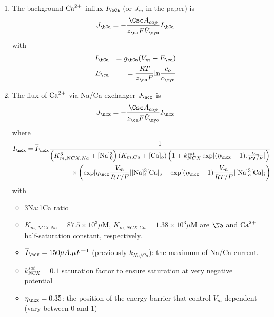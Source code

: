 \begin{enumerate}
\item The background ${\text{Ca}^{2+}}$ influx $I_\bCa$ (or $J_{in}$ in the paper)
  is~\citep{rice1999mgg}
  \begin{equation}
    \label{eq:1020}
    J_\bCa = -\frac{\Csc A_{cap}}{z_\ca F \hat{V}_\myo}I_\bCa
  \end{equation}
  with 
  \begin{eqnarray}
    \label{eq:1026}
    I_\bCa&&=g_\bCa(V_m-E_\ca) \\
    E_\ca &&= \frac{RT}{z_\ca F}\ln\frac{c_o}{c_\myo}
  \end{eqnarray}


\item The flux of ${\text{Ca}^{2+}}$ via Na/Ca exchanger $J_\ncx$ is
  \begin{equation}
    \label{eq:1021}
    J_\ncx = -\frac{\Csc A_{cap}}{z_\ca F\hat{V}_\myo}I_\ncx
  \end{equation}
  where ~\citep{luo1994dmc_a,jafri1998cad,rice1999mst}
  \begin{equation}
    \label{eq:1024}
    \begin{split}
      I_\ncx = \overline{I}_\ncx \frac{1}{\left(K^3_{m,NCX.Na}+[\ce{Na}]_0^3\right)
        \left(K_{m,Ca}+[\ce{Ca}]_o\right)\left(1+k^{sat}_{NCX}\exp[(\eta_\ncx-1).\frac{V_m}{RT/F}]\right)}
      \\
      \times\left(\exp[\eta_\ncx\frac{V_m}{RT/F}] [\ce{Na}]_i^3 [\ce{Ca}]_o -
        \exp[(\eta_\ncx-1)\frac{V_m}{RT/F}] [\ce{Na}]_o^3 [\ce{Ca}]_i\right)
    \end{split}
  \end{equation}
  with
  \begin{itemize}
  \item 3Na:1Ca ratio

  \item $K_{m,NCX.Na}=87.5\times 10^3\mu$M, $K_{m,NCX.Ca}=1.38\times
    10^3\mu$M are $\Na$ and ${\text{Ca}^{2+}}$ half-saturation constant,
    respectively.

  \item $\overline{I}_\ncx=150\mu A.\mu F^{-1}$ (previously $k_{Na/Ca}$): the
    maximum of Na/Ca current.

  \item $k^{sat}_{NCX}=0.1$ saturation factor to ensure saturation at
    very negative potential

  \item $\eta_\ncx = 0.35$: the position of the energy barrier that
    control $V_m$-dependent (vary between 0 and 1)
  \end{itemize}



\end{enumerate}
